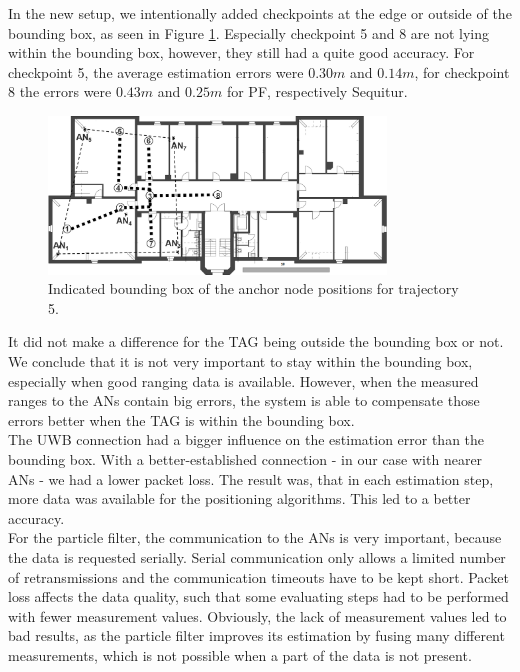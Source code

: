In the new setup, we intentionally added checkpoints at the edge or outside of the bounding box, as seen in Figure \ref{fig:trajectory5_boundingBox}. Especially checkpoint 5 and 8 are not lying within the bounding box, however, they still had a quite good accuracy. For checkpoint 5, the average estimation errors were $0.30m$ and $0.14m$, for checkpoint 8 the errors were $0.43m$ and $0.25m$ for PF, respectively Sequitur.
\begin{figure}[th]
\centering
\includegraphics[width=0.8\textwidth]{Figures/trajectory5_boundingBox}
\decoRule
\caption[Trajectory 5 with Bounding Box]{Indicated bounding box of the anchor node positions for trajectory 5.}
\label{fig:trajectory5_boundingBox}
\end{figure}
It did not make a difference for the TAG being outside the bounding box or not. We conclude that it is not very important to stay within the bounding box, especially when good ranging data is available. However, when the measured ranges to the ANs contain big errors, the system is able to compensate those errors better when the TAG is within the bounding box. \\
\noindent\hspace*{5mm}%
The UWB connection had a bigger influence on the estimation error than the bounding box. With a better-established connection - in our case with nearer ANs - we had a lower packet loss. The result was, that in each estimation step, more data was available for the positioning algorithms. This led to a better accuracy.\\
For the particle filter, the communication to the ANs is very important, because the data is requested serially. Serial communication only allows a limited number of retransmissions and the communication timeouts have to be kept short. Packet loss affects the data quality, such that some evaluating steps had to be performed with fewer measurement values. Obviously, the lack of measurement values led to bad results, as the particle filter improves its estimation by fusing many different measurements, which is not possible when a part of the data is not present.